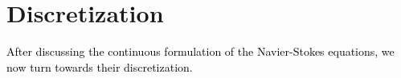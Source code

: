 \documentclass{m2an}
\newcommand\blue[1]{\textcolor{black}{#1}}
\newcommand{\Oprod}[1]{\left( #1 \right)_{\Omega}}
\newcommand{\Opair}[1]{\left\langle #1 \right\rangle_{\Omega}}
\begin{document}

\section{Discretization}\label{sec:Discretization}
\blue{After discussing the continuous formulation of the Navier-Stokes equations, we now turn towards their
discretization.}
\end{document}
